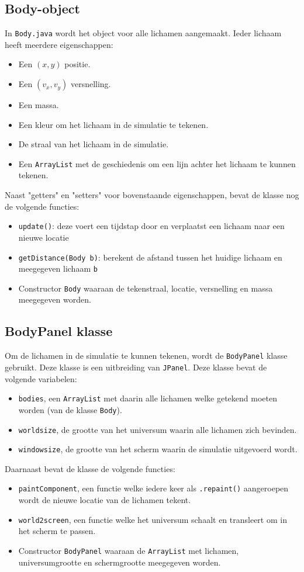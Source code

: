 \documentclass[12pt]{article}
\begin{document}
\subsection{Body-object}
In \verb|Body.java| wordt het object voor alle lichamen aangemaakt. Ieder lichaam heeft meerdere eigenschappen:
\begin{itemize}
\item Een $(x, y)$ positie.
\item Een $(v_x, v_y)$ versnelling.
\item Een massa.
\item Een kleur om het lichaam in de simulatie te tekenen.
\item De straal van het lichaam in de simulatie.
\item Een \verb|ArrayList| met de geschiedenis om een lijn achter het lichaam te kunnen tekenen.
\end{itemize}
Naast "getters" en "setters" voor bovenstaande eigenschappen, bevat de klasse nog de volgende functies:
\begin{itemize}
\item \verb|update()|: deze voert een tijdstap door en verplaatst een lichaam naar een nieuwe locatie
\item \verb|getDistance(Body b)|: berekent de afstand tussen het huidige lichaam en meegegeven lichaam \verb|b|
\item Constructor \verb|Body| waaraan de tekenstraal, locatie, versnelling en massa meegegeven worden.
\end{itemize}
\subsection{BodyPanel klasse}
Om de lichamen in de simulatie te kunnen tekenen, wordt de \verb|BodyPanel| klasse gebruikt. Deze klasse is een uitbreiding van \verb|JPanel|. Deze klasse bevat de volgende variabelen:
\begin{itemize}
\item \verb|bodies|, een \verb|ArrayList| met daarin alle lichamen welke getekend moeten worden (van de klasse \verb|Body|).
\item \verb|worldsize|, de grootte van het universum waarin alle lichamen zich bevinden.
\item \verb|windowsize|, de grootte van het scherm waarin de simulatie uitgevoerd wordt.
\end{itemize}
Daarnaast bevat de klasse de volgende functies:
\begin{itemize}
\item \verb|paintComponent|, een functie welke iedere keer als \verb|.repaint()| aangeroepen wordt de nieuwe locatie van de lichamen tekent.
\item \verb|world2screen|, een functie welke het universum schaalt en transleert om in het scherm te passen.
\item Constructor \verb|BodyPanel| waaraan de \verb|ArrayList| met lichamen, universumgrootte en schermgrootte meegegeven worden.
\end{itemize}
\end{document}

